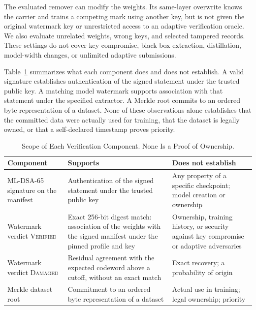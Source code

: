\documentclass[conference]{IEEEtran}
\begin{document}
The evaluated remover can modify the weights. Its same-layer overwrite knows
the carrier and trains a competing mark using another key, but is not given
the original watermark key or unrestricted access to an adaptive verification
oracle. We also evaluate unrelated weights, wrong keys, and selected tampered
records. These settings do not cover key compromise, black-box extraction,
distillation, model-width changes, or unlimited adaptive submissions.

Table~\ref{tab:claims} summarizes what each component does and does not
establish. A valid signature establishes authentication of the signed statement
under the trusted public key. A matching model watermark supports association
with that statement under the specified extractor. A Merkle root commits to an
ordered byte representation of a dataset. None of these observations alone
establishes that the committed data were actually used for training, that the
dataset is legally owned, or that a self-declared timestamp proves priority.

\begin{table}[!t]
\centering\caption{Scope of Each Verification Component. None Is a Proof of Ownership.}
\label{tab:claims}\scriptsize\setlength{\tabcolsep}{3pt}
\renewcommand{\arraystretch}{1.1}
\begin{tabular}{@{}>{\raggedright\arraybackslash}p{}>{\raggedright\arraybackslash}p{}>{\raggedright\arraybackslash}p{}@{}}
\toprule
Component & Supports & Does not establish\\
\midrule
ML-DSA-65 signature on the manifest & Authentication of the signed statement under the trusted public key & Any property of a specific checkpoint; model creation or ownership\\
Watermark verdict \textsc{Verified} & Exact 256-bit digest match: association of the weights with the signed manifest under the pinned profile and key & Ownership, training history, or security against key compromise or adaptive adversaries\\
Watermark verdict \textsc{Damaged} & Residual agreement with the expected codeword above a cutoff, without an exact match & Exact recovery; a probability of origin\\
Merkle dataset root & Commitment to an ordered byte representation of a dataset & Actual use in training; legal ownership; priority\\
\bottomrule
\end{tabular}
\end{table}
\end{document}
